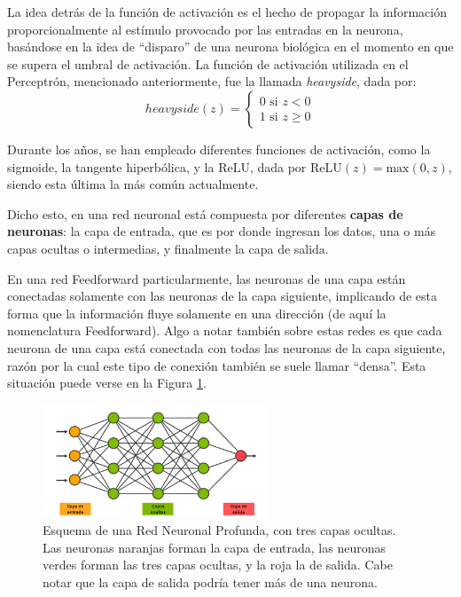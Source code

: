 \documentclass[../../main.tex]{subfiles}
\begin{document}
La idea detrás de la función de activación es el hecho de propagar la información proporcionalmente al estímulo provocado por las entradas en la neurona, basándose en la idea de ``disparo'' de una neurona biológica en el momento en que se supera el umbral de activación. La función de activación utilizada en el Perceptrón, mencionado anteriormente, fue la llamada \textit{heavyside}, dada por:
\[
    heavyside\left(z\right) =
        \begin{cases}  
            0\text{ si }z < 0 \\
            1\text{ si }z \geq 0
        \end{cases}
\] 

Durante los años, se han empleado diferentes funciones de activación, como la sigmoide, la tangente hiperbólica, y la ReLU, dada por \(\text{ReLU}(z)=\text{max}(0, z)\), siendo esta última la más común actualmente.

Dicho esto, en una red neuronal está compuesta por diferentes \textbf{capas de neuronas}: la capa de entrada, que es por donde ingresan los datos, una o más capas ocultas o intermedias, y finalmente la capa de salida. 

En una red Feedforward particularmente, las neuronas de una capa están conectadas solamente con las neuronas de la capa siguiente, implicando de esta forma que la información fluye solamente en una dirección (de aquí la nomenclatura Feedforward). Algo a notar también sobre estas redes es que cada neurona de una capa está conectada con todas las neuronas de la capa siguiente, razón por la cual este tipo de conexión también se suele llamar ``densa''. Esta situación puede verse en la Figura \ref{fig:neural-net}. 

\begin{figure}[h!]
    \centering
    \includegraphics[width=0.6\textwidth]{figs/feedforward.png}
    \caption{Esquema de una Red Neuronal Profunda, con tres capas ocultas. Las neuronas naranjas forman la capa de entrada, las neuronas verdes forman las tres capas ocultas, y la roja la de salida. Cabe notar que la capa de salida podría tener más de una neurona.}
    \label{fig:neural-net}
\end{figure}
\end{document}
